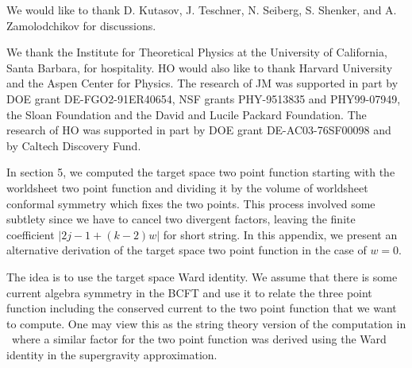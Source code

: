 \bigskip

We would like to thank
D. Kutasov,
 J. Teschner, N. Seiberg, S. Shenker,  and A. Zamolodchikov for discussions.

\smallskip

We thank the Institute for Theoretical Physics at the University
of California, Santa Barbara, for hospitality.
HO would also like
to thank Harvard University and the Aspen Center for
Physics. The research of JM
was supported in part by DOE grant DE-FGO2-91ER40654,
NSF grants PHY-9513835 and PHY99-07949, the Sloan Foundation
and the David and Lucile Packard Foundation.
The research of HO was supported in part by
DOE grant DE-AC03-76SF00098 and by Caltech Discovery Fund.

\vfill



In section 5, we computed the target space two point function
starting with the worldsheet two point function and dividing it
by the volume of worldsheet conformal symmetry which fixes the
two points. This process involved some subtlety since we have
to cancel two divergent factors, leaving the finite coefficient
$|2j-1+(k-2)w|$ for short string. In this appendix, we present an alternative
derivation of the target space two point function in the case
of $w=0$.

The idea is to use the target space Ward identity.
We assume that there is some current algebra symmetry
in the BCFT and use it to relate the three point function
including the conserved current to the two point function
that we want to compute.
One may view this as the string theory
version of the computation in \freedman\ where
a similar factor  for the two point function was
derived using the Ward identity in the supergravity
approximation.

